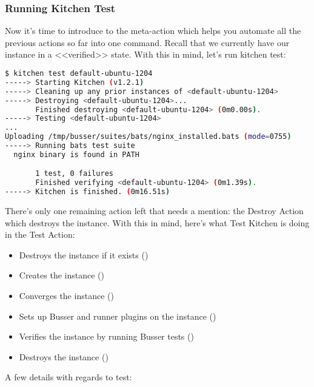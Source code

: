 \subsubsection{Running Kitchen Test}

Now it's time to introduce to the  meta-action which helps you automate all the previous actions so far into one command. Recall that we currently have our instance in a <<verified>> state. With this in mind, let's run kitchen test:

\begin{lstlisting}[language=Bash,label=lst:testing-test-kitchen18]
$ kitchen test default-ubuntu-1204
-----> Starting Kitchen (v1.2.1)
-----> Cleaning up any prior instances of <default-ubuntu-1204>
-----> Destroying <default-ubuntu-1204>...
       Finished destroying <default-ubuntu-1204> (0m0.00s).
-----> Testing <default-ubuntu-1204>
...
Uploading /tmp/busser/suites/bats/nginx_installed.bats (mode=0755)
-----> Running bats test suite
  nginx binary is found in PATH

       1 test, 0 failures
       Finished verifying <default-ubuntu-1204> (0m1.39s).
-----> Kitchen is finished. (0m16.51s)
\end{lstlisting}

There's only one remaining action left that needs a mention: the Destroy Action which destroys the instance. With this in mind, here's what Test Kitchen is doing in the Test Action:

\begin{itemize}
  \item Destroys the instance if it exists ()
  \item Creates the instance ()
  \item Converges the instance ()
  \item Sets up Busser and runner plugins on the instance ()
  \item Verifies the instance by running Busser tests ()
  \item Destroys the instance ()
\end{itemize}

A few details with regards to test:

